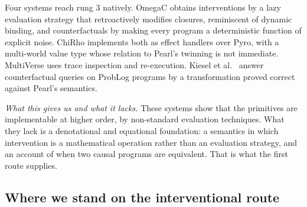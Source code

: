 Four systems reach rung 3 natively. OmegaC \cite{tavares2021language} obtains interventions by a lazy evaluation strategy that retroactively modifies closures, reminiscent of dynamic binding, and counterfactuals by making every program a deterministic function of explicit noise. ChiRho \cite{chirho} implements both as effect handlers over Pyro, with a multi-world value type whose relation to Pearl's twinning is not immediate. MultiVerse \cite{perov2020multiverse} uses trace inspection and re-execution. Kiesel et al.\ \cite{kiesel2023whatif} answer counterfactual queries on ProbLog programs by a transformation proved correct against Pearl's semantics.

\emph{What this gives us and what it lacks.} These systems show that the primitives are implementable at higher order, by non-standard evaluation techniques. What they lack is a denotational and equational foundation: a semantics in which intervention is a mathematical operation rather than an evaluation strategy, and an account of when two causal programs are equivalent. That is what the first route supplies.

\subsection{Where we stand on the interventional route}\label{sec:intv-wherewestand}

